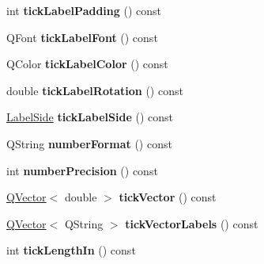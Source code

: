 \begin{DoxyCompactItemize}
\item 
int {\bfseries tick\+Label\+Padding} () const \hypertarget{class_q_c_p_axis_af7bc2fac3f95949ecd0204d20dc1463b}{}\label{class_q_c_p_axis_af7bc2fac3f95949ecd0204d20dc1463b}

\item 
Q\+Font {\bfseries tick\+Label\+Font} () const \hypertarget{class_q_c_p_axis_af6d7ad17f3398b114a413f7a3dc5ef9d}{}\label{class_q_c_p_axis_af6d7ad17f3398b114a413f7a3dc5ef9d}

\item 
Q\+Color {\bfseries tick\+Label\+Color} () const \hypertarget{class_q_c_p_axis_ac86d0636aa55ddd94df171f609897a32}{}\label{class_q_c_p_axis_ac86d0636aa55ddd94df171f609897a32}

\item 
double {\bfseries tick\+Label\+Rotation} () const \hypertarget{class_q_c_p_axis_ab9199d72b8c4c06cc6c9b928c30d00d2}{}\label{class_q_c_p_axis_ab9199d72b8c4c06cc6c9b928c30d00d2}

\item 
\hyperlink{class_q_c_p_axis_a24b13374b9b8f75f47eed2ea78c37db9}{Label\+Side} {\bfseries tick\+Label\+Side} () const \hypertarget{class_q_c_p_axis_a0a33835705406506b02a445b1ba32357}{}\label{class_q_c_p_axis_a0a33835705406506b02a445b1ba32357}

\item 
Q\+String {\bfseries number\+Format} () const \hypertarget{class_q_c_p_axis_ae6729b40845b29ffa5a440aa53cec215}{}\label{class_q_c_p_axis_ae6729b40845b29ffa5a440aa53cec215}

\item 
int {\bfseries number\+Precision} () const \hypertarget{class_q_c_p_axis_a91cb2825060ac79a889296377fe0c7c1}{}\label{class_q_c_p_axis_a91cb2825060ac79a889296377fe0c7c1}

\item 
\hyperlink{class_q_vector}{Q\+Vector}$<$ double $>$ {\bfseries tick\+Vector} () const \hypertarget{class_q_c_p_axis_a5b00b14f480f926df976cc6c52309e78}{}\label{class_q_c_p_axis_a5b00b14f480f926df976cc6c52309e78}

\item 
\hyperlink{class_q_vector}{Q\+Vector}$<$ Q\+String $>$ {\bfseries tick\+Vector\+Labels} () const \hypertarget{class_q_c_p_axis_a64e6fa81f943ad33dcaf3fa606687b93}{}\label{class_q_c_p_axis_a64e6fa81f943ad33dcaf3fa606687b93}

\item 
int {\bfseries tick\+Length\+In} () const \hypertarget{class_q_c_p_axis_a59265d65c5034695ac2578bccbbb0f4a}{}\label{class_q_c_p_axis_a59265d65c5034695ac2578bccbbb0f4a}


\end{DoxyCompactItemize}
